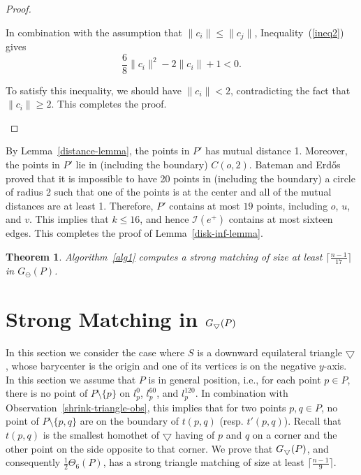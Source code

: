 \documentclass[11pt,a4paper]{article}
\newcommand{\G}[2]{G_{#1}({#2})}
\newcommand{\trid}{\bigtriangledown}
\newcommand{\trids}{\scriptsize\bigtriangledown}
\newtheorem{theorem}{Theorem}
\begin{document}
\begin{proof}
\begin{itemize}
\begin{itemize}
In combination with the assumption that $\|c_i\| \le \|c_j\|$, Inequality~(\ref{ineq2}) gives
$$\frac{6}{8}\|c_i\|^2-2\|c_i\|+1<0.$$

To satisfy this inequality, we should have $\|c_i\|<2$, contradicting the fact
that $\|c_i\| \ge 2$. This completes the proof.
\end{itemize}
\end{itemize}
\end{proof}

By Lemma~\ref{distance-lemma}, the points in $P'$ has mutual distance 1. Moreover, the points in $P'$ lie in (including the boundary) $C(o,2)$.
Bateman and Erd\H{o}s~\cite{Bateman1951} proved that it is impossible to have 20 points in (including the boundary) a circle of radius 2 such that one of the points is at the center and all of the mutual distances are at least 1.
Therefore, $P'$ contains at most $19$ points, including $o$, $u$, and $v$. This implies that $k\le 16$, and hence $\mathcal{I}(e^+)$ contains at most sixteen edges. This completes the proof of Lemma~\ref{disk-inf-lemma}.

\begin{theorem}
 \label{Gabriel-thr}
Algorithm~\ref{alg1} computes a strong matching of size at least $\lceil\frac{n-1}{17}\rceil$ in $\G{\ominus}{P}$.
\end{theorem}


\section{Strong Matching in $\G{\trids}{P}$}
\label{half-theta-six-section}
In this section we consider the case where $S$ is a downward equilateral triangle $\trid$, whose barycenter is the origin and one of its vertices is on the negative $y$-axis. In this section we assume that $P$ is in general position, i.e., for each point $p\in P$, there is no point of $P\setminus \{p\}$ on $l_p^0$, $l_p^{60}$, and $l_p^{120}$. In combination with Observation~\ref{shrink-triangle-obs}, this implies that for two points $p,q\in P$, no point of $P\setminus\{p,q\}$ are on the boundary of $t(p,q)$ (resp. $t'(p,q)$). Recall that $t(p,q)$ is the smallest homothet of $\trid$ having of $p$ and $q$ on a corner and the other point on the side opposite to that corner. We prove that $\G{\trids}{P}$, and consequently $\frac{1}{2}\Theta_6(P)$, has a strong triangle matching of size at least $\lceil\frac{n-1}{9}\rceil$. 
\end{document}
